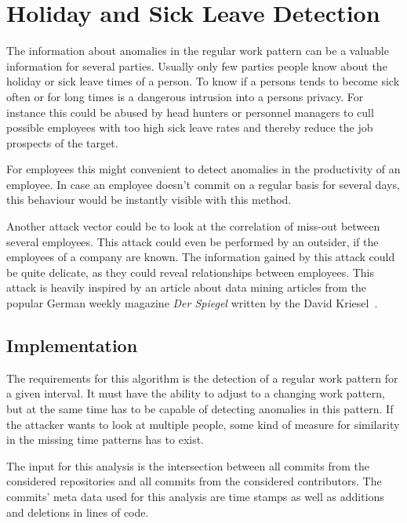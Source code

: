 \section{Holiday and Sick Leave Detection}

The information about anomalies in the regular work pattern can be a valuable information for several parties.
Usually only few parties people know about the holiday or sick leave times of a person.
To know if a persons tends to become sick often or for long times is a dangerous intrusion into a persons privacy.
For instance this could be abused by head hunters or personnel managers to cull possible employees with too high sick leave rates and thereby reduce the job prospects of the target.

For employees this might convenient to detect anomalies in the productivity of an employee.
In case an employee doesn't commit on a regular basis for several days, this behaviour would be instantly visible with this method.

Another attack vector could be to look at the correlation of miss-out between several employees.
This attack could even be performed by an outsider, if the employees of a company are known.
The information gained by this attack could be quite delicate, as they could reveal relationships between employees.
This attack is heavily inspired by an article about data mining articles from the popular German weekly magazine \emph{Der Spiegel} written by the David Kriesel~\cite{article:spiegel-mining}.


\subsection{Implementation}

The requirements for this algorithm is the detection of a regular work pattern for a given interval.
It must have the ability to adjust to a changing work pattern, but at the same time has to be capable of detecting anomalies in this pattern.
If the attacker wants to look at multiple people, some kind of measure for similarity in the missing time patterns has to exist.

The input for this analysis is the intersection between all commits from the considered repositories and all commits from the considered contributors.
The commits' meta data used for this analysis are time stamps as well as additions and deletions in lines of code.

